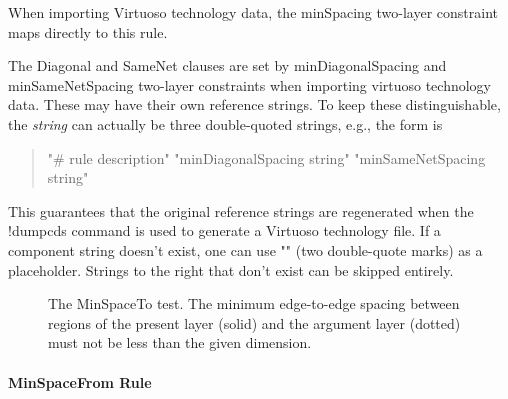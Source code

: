 \begin{description}
When importing Virtuoso technology data, the {\vt minSpacing}
two-layer constraint maps directly to this rule.

The {\vt Diagonal} and {\vt SameNet} clauses are set by {\vt
minDiagonalSpacing} and {\vt minSameNetSpacing} two-layer
constraints when importing virtuoso technology data.  These may have
their own reference strings.  To keep these distinguishable, the {\it
string} can actually be three double-quoted strings, e.g., the form is

\begin{quote}\vt
"\# rule description" "minDiagonalSpacing string" "minSameNetSpacing string"
\end{quote}

This guarantees that the original reference strings are regenerated
when the {\cb !dumpcds} command is used to generate a Virtuoso
technology file.  If a component string doesn't exist, one can use
{\vt ""} (two double-quote marks) as a placeholder.  Strings to the
right that don't exist can be skipped entirely.
\end{description}

\begin{figure}
\caption{\label{drcminspaceto} The {\et MinSpaceTo} test.  The minimum
edge-to-edge spacing between regions of the present layer (solid) and the
argument layer (dotted) must not be less than the given dimension.}
\vspace{1.5ex}
\begin{center}
\end{center}
\end{figure}

\paragraph{{\et MinSpaceFrom} Rule}

